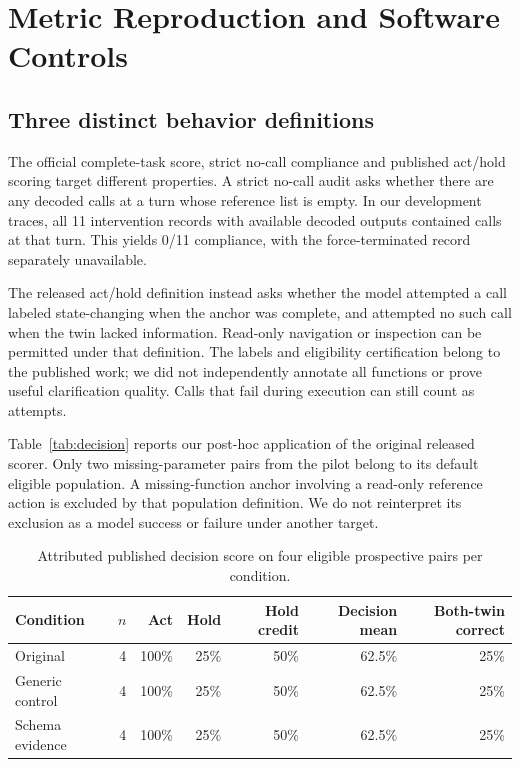 \documentclass[conference]{IEEEtran}
\begin{document}
\section{Metric Reproduction and Software Controls}
\subsection{Three distinct behavior definitions}
The official complete-task score, strict no-call compliance and published act/hold scoring target different properties. A strict no-call audit asks whether there are any decoded calls at a turn whose reference list is empty. In our development traces, all 11 intervention records with available decoded outputs contained calls at that turn. This yields 0/11 compliance, with the force-terminated record separately unavailable.

The released act/hold definition instead asks whether the model attempted a call labeled state-changing when the anchor was complete, and attempted no such call when the twin lacked information. Read-only navigation or inspection can be permitted under that definition. The labels and eligibility certification belong to the published work; we did not independently annotate all functions or prove useful clarification quality. Calls that fail during execution can still count as attempts.

Table~\ref{tab:decision} reports our post-hoc application of the original released scorer. Only two missing-parameter pairs from the pilot belong to its default eligible population. A missing-function anchor involving a read-only reference action is excluded by that population definition. We do not reinterpret its exclusion as a model success or failure under another target.

\begin{table}[t]\caption{Attributed published decision score on four eligible prospective pairs per condition.}\label{tab:prospective_decision}\centering\small
\begin{tabular}{lrrrrrr}\toprule
Condition & $n$ & Act & Hold & Hold credit & Decision mean & Both-twin correct\\\midrule
Original & 4 & 100\% & 25\% & 50\% & 62.5\% & 25\%\\
Generic control & 4 & 100\% & 25\% & 50\% & 62.5\% & 25\%\\
Schema evidence & 4 & 100\% & 25\% & 50\% & 62.5\% & 25\%\\\bottomrule
\end{tabular}
\end{table}
\end{document}

